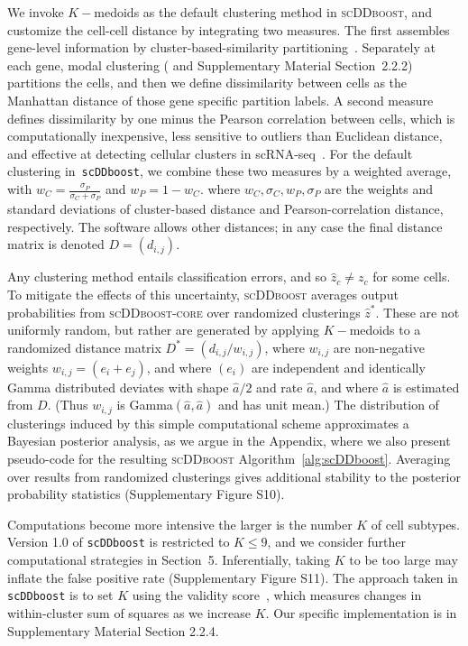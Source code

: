 \documentclass[aoas,preprint]{imsart}
\begin{document}
We invoke $K-$medoids \citep{kmedoids} 
as the default clustering method in \textsc{scDDboost}, and customize the cell-cell distance by integrating two measures.  
The first assembles gene-level information by cluster-based-similarity partitioning~\citep{ref:cspa}.
 Separately at each gene,   modal clustering (\cite{ref:dahl} and Supplementary Material Section~2.2.2) partitions the cells, and
then we define dissimilarity between cells as the Manhattan distance of those gene specific partition labels.
A second measure defines dissimilarity by one minus the 
Pearson correlation between cells, which is computationally inexpensive,
less sensitive to outliers than Euclidean distance, and effective at detecting cellular clusters in 
scRNA-seq~\citep{Cor}.
 For the default clustering in~\verb+scDDboost+, we combine these 
two measures by a weighted average, 
with  $w_C = \frac{\sigma_P}{\sigma_C + \sigma_P}$ and $w_P = 1 - w_C$. where $w_C,\sigma_C, w_P, \sigma_P$ are the weights and standard deviations of cluster-based distance and Pearson-correlation distance, respectively.  The software allows 
other distances; in any case 
the final distance matrix is denoted $D=\left( d_{i,j} \right)$. 

Any clustering method  entails classification errors, and so $\hat z_c \neq z_c$ for some cells. To mitigate
the effects of this uncertainty, \textsc{scDDboost} averages output probabilities from \textsc{scDDboost-core} over
randomized clusterings $\hat z^*$.  These are not uniformly random, but rather are generated by applying $K-$medoids
to a randomized distance matrix $D^*=\left( d_{i,j}/ w_{i,j}\right)$, 
where $w_{i,j}$ are   non-negative weights
$w_{i,j} = ( e_i + e_j )$, and where $( e_i) $ are independent and identically 
Gamma distributed deviates with shape $\hat a/2$  and rate $\hat a$, 
and where $\hat a$ is estimated from $D$. (Thus $w_{i,j}$ is Gamma$(\hat a, \hat a)$ and has unit mean.)  
The distribution of
clusterings induced by this simple computational 
scheme approximates a Bayesian posterior analysis, as we argue in
the Appendix, where we also present pseudo-code for the resulting \textsc{scDDboost} 
Algorithm~\ref{alg:scDDboost}.
Averaging over results from randomized clusterings 
 gives additional stability to the posterior probability statistics
 (Supplementary Figure S10).


Computations become more intensive the larger is the number $K$ of cell subtypes. Version 1.0 of 
\verb+scDDboost+ is restricted to $K\leq 9$, and we consider further computational
strategies in Section~5. Inferentially, 
 taking $K$ to be too large may inflate the false positive rate (Supplementary Figure S11).
 The approach
taken in \verb+scDDboost+ is to set $K$ using the validity score~\citep{selK}, which measures 
changes in within-cluster sum of squares as we increase $K$.  Our specific implementation is in
Supplementary Material Section 2.2.4.
\end{document}
